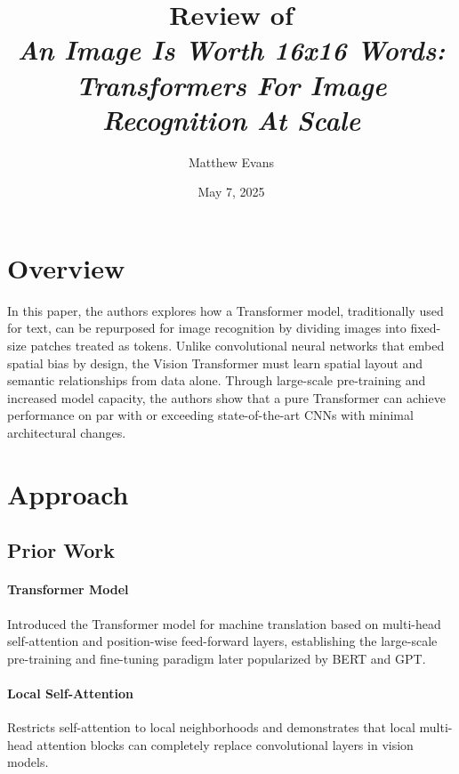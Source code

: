 \documentclass[10pt]{article}
\title{
    Review of \\
    \textit{An Image Is Worth 16x16 Words:\\Transformers For Image Recognition At Scale}
}
\author{Matthew Evans}
\date{May 7, 2025}
\begin{document}
\maketitle

\section*{Overview}
In this paper\cite{DBLP:journals/corr/abs-2010-11929}, the authors explores how a Transformer model, traditionally used for text, can be repurposed for image recognition by dividing images into fixed-size patches treated as tokens. Unlike convolutional neural networks that embed spatial bias by design, the Vision Transformer must learn spatial layout and semantic relationships from data alone. Through large-scale pre-training and increased model capacity, the authors show that a pure Transformer can achieve performance on par with or exceeding state-of-the-art CNNs with minimal architectural changes.


\section*{Approach}
\subsection*{Prior Work}

\paragraph{Transformer Model \cite{DBLP:journals/corr/VaswaniSPUJGKP17}} Introduced the Transformer model for machine translation based on multi-head self-attention and position-wise feed-forward layers, establishing the large-scale pre-training and fine-tuning paradigm later popularized by BERT\cite{DBLP:journals/corr/abs-1810-04805} and GPT\cite{radford2019language, NEURIPS2020_1457c0d6}.

\paragraph{Local Self-Attention \cite{DBLP:journals/corr/abs-1802-05751, DBLP:journals/corr/abs-1904-11491, DBLP:journals/corr/abs-1906-05909, DBLP:journals/corr/abs-2004-13621}} Restricts self-attention to local neighborhoods and demonstrates that local multi-head attention blocks can completely replace convolutional layers in vision models.
\end{document}
